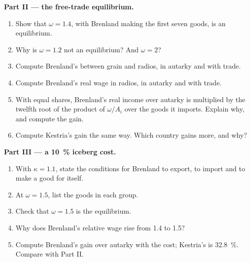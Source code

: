 \begin{problem}
\medskip\noindent\textbf{Part II --- the free-trade equilibrium.}
\begin{enumerate}[resume]
\item Show that $\omega = 1.4$, with Brenland making the first seven goods, is an
equilibrium.
\item Why is $\omega = 1.2$ not an equilibrium? And $\omega = 2$?
\item Compute Brenland's  between grain and radios, in autarky
and with trade.
\item Compute Brenland's real wage in radios, in autarky and with trade.
\item With equal shares, Brenland's real income over autarky is multiplied by
the twelfth root of the product of $\omega/A_i$ over the goods it imports. Explain
why, and compute the gain.
\item Compute Kestria's gain the same way. Which country gains more, and why?
\end{enumerate}

\medskip\noindent\textbf{Part III --- a 10~\% iceberg cost.}
\begin{enumerate}[resume]
\item With $\kappa = 1.1$, state the conditions for Brenland to export, to import
and to make a good for itself.
\item At $\omega = 1.5$, list the goods in each group.
\item Check that $\omega = 1.5$ is the equilibrium.
\item Why does Brenland's relative wage rise from 1.4 to 1.5?
\item Compute Brenland's gain over autarky with the  cost; Kestria's is
32.8~\%. Compare with Part II.
\end{enumerate}


\end{problem}
